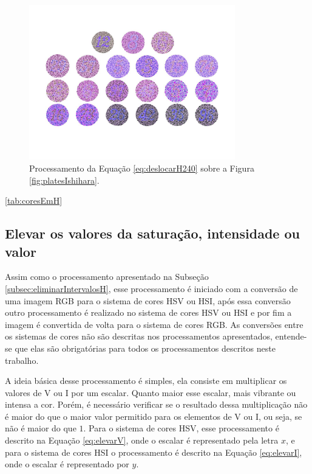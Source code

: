 \documentclass[	12pt, Times, openright, twoside, a4paper, english, brazil]{abntex2}
\begin{document}
\begin{figure}[!htb]
\centering \includegraphics[width=0.80\textwidth]{figuraDeslocar240.jpg}
\caption{Processamento da Equação \ref{eq:deslocarH240} sobre a Figura \ref{fig:platesIshihara}. \label{fig:deslocamento240}}
\end{figure}



\ref{tab:coresEmH}

\subsection{Elevar os valores da saturação, intensidade ou valor}
\label{subsec:deslocarVouI}

Assim como o processamento apresentado na Subseção \ref{subsec:eliminarIntervalosH}, esse processamento é iniciado com a conversão de uma imagem RGB para o sistema de cores HSV ou HSI, após essa conversão outro processamento é realizado no sistema de cores HSV ou HSI e por fim a imagem é convertida de volta para o sistema de cores RGB. As conversões entre os sistemas de cores não são descritas nos processamentos apresentados, entende-se que elas são obrigatórias para todos os processamentos descritos neste trabalho.

A ideia básica desse processamento é simples, ela consiste em multiplicar os valores de V ou I por um escalar. Quanto maior esse escalar, mais vibrante ou intensa a cor. Porém, é necessário verificar se o resultado dessa multiplicação não é maior do que o maior valor permitido para os elementos de V ou I, ou seja, se não é maior do que $1$. Para o sistema de cores HSV, esse processamento é descrito na Equação \ref{eq:elevarV}, onde o escalar é representado pela letra $x$, e para o sistema de cores HSI o processamento é descrito na Equação \ref{eq:elevarI}, onde o escalar é representado por $y$.
\end{document}
